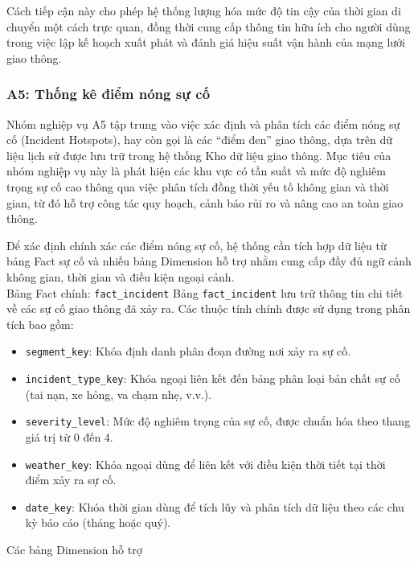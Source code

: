 Cách tiếp cận này cho phép hệ thống lượng hóa mức độ tin cậy của thời gian di chuyển một cách trực quan, đồng thời cung cấp thông tin hữu ích cho người dùng trong việc lập kế hoạch xuất phát và đánh giá hiệu suất vận hành của mạng lưới giao thông.

\subsubsection{A5: Thống kê điểm nóng sự cố}

Nhóm nghiệp vụ A5 tập trung vào việc xác định và phân tích các điểm nóng sự cố (Incident Hotspots), hay còn gọi là các ``điểm đen'' giao thông, dựa trên dữ liệu lịch sử được lưu trữ trong hệ thống Kho dữ liệu giao thông. Mục tiêu của nhóm nghiệp vụ này là phát hiện các khu vực có tần suất và mức độ nghiêm trọng sự cố cao thông qua việc phân tích đồng thời yếu tố không gian và thời gian, từ đó hỗ trợ công tác quy hoạch, cảnh báo rủi ro và nâng cao an toàn giao thông.\\


Để xác định chính xác các điểm nóng sự cố, hệ thống cần tích hợp dữ liệu từ bảng Fact sự cố và nhiều bảng Dimension hỗ trợ nhằm cung cấp đầy đủ ngữ cảnh không gian, thời gian và điều kiện ngoại cảnh.\\

Bảng Fact chính: \texttt{fact\_incident}
Bảng \texttt{fact\_incident} lưu trữ thông tin chi tiết về các sự cố giao thông đã xảy ra. Các thuộc tính chính được sử dụng trong phân tích bao gồm:
\begin{itemize}
    \item \texttt{segment\_key}: Khóa định danh phân đoạn đường nơi xảy ra sự cố.
    \item \texttt{incident\_type\_key}: Khóa ngoại liên kết đến bảng phân loại bản chất sự cố (tai nạn, xe hỏng, va chạm nhẹ, v.v.).
    \item \texttt{severity\_level}: Mức độ nghiêm trọng của sự cố, được chuẩn hóa theo thang giá trị từ 0 đến 4.
    \item \texttt{weather\_key}: Khóa ngoại dùng để liên kết với điều kiện thời tiết tại thời điểm xảy ra sự cố.
    \item \texttt{date\_key}: Khóa thời gian dùng để tích lũy và phân tích dữ liệu theo các chu kỳ báo cáo (tháng hoặc quý).
\end{itemize}

Các bảng Dimension hỗ trợ

